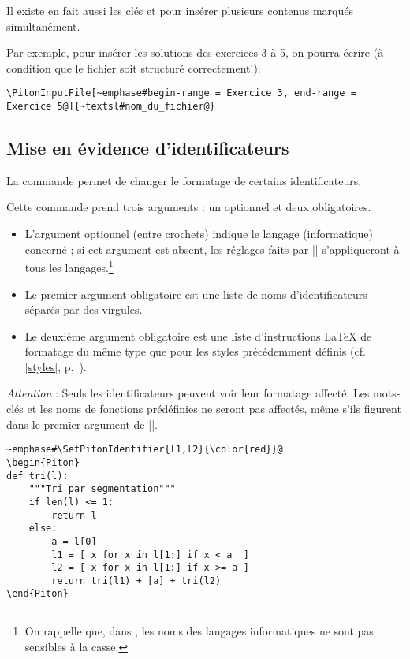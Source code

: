 \documentclass[dvipsnames,svgnames]{article}
\begin{document}
\bigskip
{}
Il existe en fait aussi les clés  et  pour insérer plusieurs
contenus marqués simultanément. 

Par exemple, pour insérer les solutions des exercices 3 à 5, on pourra écrire (à condition que le fichier soit
structuré correctement!):

\begin{Verbatim}
\PitonInputFile[~emphase#begin-range = Exercice 3, end-range = Exercice 5@]{~textsl#nom_du_fichier@}
\end{Verbatim}




\subsection{Mise en évidence d'identificateurs}

\label{SetPitonIdentifier}

La commande  permet de changer le formatage de certains identificateurs.

\smallskip
Cette commande prend trois arguments : un optionnel et deux obligatoires.

\begin{itemize}
\item L'argument optionnel (entre crochets) indique le langage (informatique) concerné ; si cet
argument est absent, les réglages faits par |\SetPitonIdentifier| s'appliqueront à tous les langages.\footnote{On rappelle que, dans , les noms des langages informatiques ne sont pas
  sensibles à la casse.}

\item Le premier argument obligatoire est une liste de noms d'identificateurs séparés par des virgules.

\item Le deuxième argument obligatoire est une liste d'instructions LaTeX de formatage du même type que pour les
styles précédemment définis (cf. \ref{styles}, p.~\pageref{styles}).


\end{itemize}

\emph{Attention} : Seuls les identificateurs peuvent voir leur formatage affecté. Les mots-clés et les noms de
fonctions prédéfinies ne seront pas affectés, même s'ils figurent dans le premier argument de
|\SetPitonIdentifier|. 

\begin{Verbatim}
~emphase#\SetPitonIdentifier{l1,l2}{\color{red}}@
\begin{Piton}
def tri(l):
    """Tri par segmentation"""
    if len(l) <= 1:
        return l
    else:
        a = l[0]
        l1 = [ x for x in l[1:] if x < a  ]
        l2 = [ x for x in l[1:] if x >= a ]
        return tri(l1) + [a] + tri(l2)
\end{Piton}
\end{Verbatim}
\end{document}
